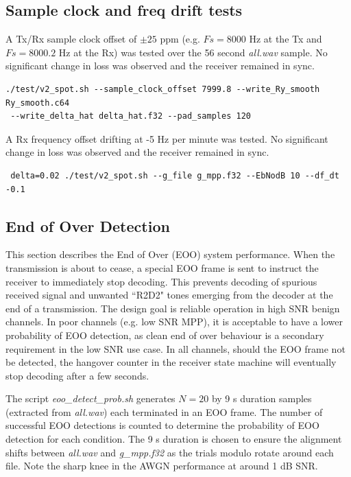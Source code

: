 \documentclass{article}
\begin{document}
\subsection{Sample clock and freq drift tests}

A Tx/Rx sample clock offset of $\pm 25$ ppm (e.g. $Fs=8000$ \si{Hz} at the Tx and $Fs=8000.2$ \si{Hz} at the Rx) was tested over the 56 second \emph{all.wav} sample. No significant change in loss was observed and the receiver remained in sync.

\begin{verbatim}
./test/v2_spot.sh --sample_clock_offset 7999.8 --write_Ry_smooth Ry_smooth.c64
 --write_delta_hat delta_hat.f32 --pad_samples 120
\end{verbatim}

A Rx frequency offset drifting at -5 \si{Hz} per minute was tested. No significant change in loss was observed and the receiver remained in sync.

\begin{verbatim}
 delta=0.02 ./test/v2_spot.sh --g_file g_mpp.f32 --EbNodB 10 --df_dt -0.1
\end{verbatim}

\subsection{End of Over Detection}

This section describes the End of Over (EOO) system performance.  When the transmission is about to cease, a special EOO frame is sent to instruct the receiver to immediately stop decoding.  This prevents decoding of spurious received signal and unwanted ``R2D2" tones emerging from the decoder at the end of a transmission.  The design goal is reliable operation in high SNR benign channels.  In poor channels (e.g. low SNR MPP), it is acceptable to have a lower probability of EOO detection, as clean end of over behaviour is a secondary requirement in the low SNR use case.  In all channels, should the EOO frame not be detected, the hangover counter in the receiver state machine will eventually stop decoding after a few seconds.

The script \emph{eoo\_detect\_prob.sh} generates $N=20$ by 9 \si{s} duration samples (extracted from \emph{all.wav}) each terminated in an EOO frame.  The number of successful EOO detections is counted to determine the probability of EOO detection for each condition.  The 9 \si{s} duration is chosen to ensure the alignment shifts between \emph{all.wav} and \emph{g\_mpp.f32} as the trials modulo rotate around each file.  Note the sharp knee in the AWGN performance at around 1 \si{dB} SNR.
\end{document}
